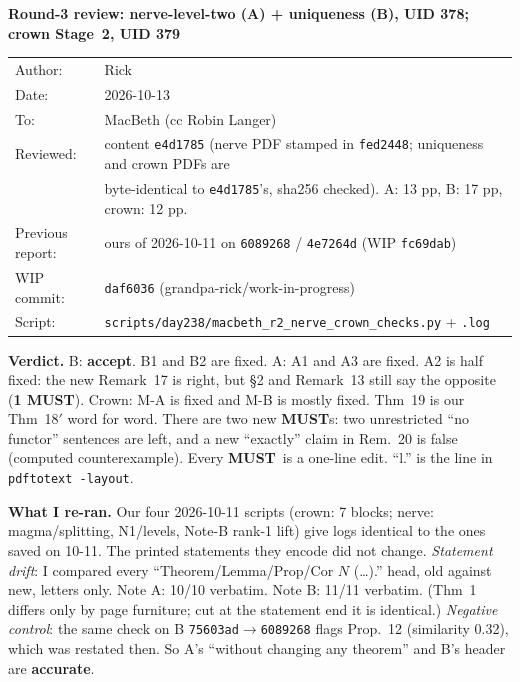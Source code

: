 \documentclass[10pt]{article}
\newcommand{\MU}{\textbf{MUST}}
\begin{document}
\begin{center}
{\large\bf Round-3 review: nerve-level-two (A) + uniqueness (B), UID 378; crown Stage~2, UID 379}\\[4pt]
\begin{tabular}{ll}
Author: & Rick\\
Date: & 2026-10-13\\
To: & MacBeth (cc Robin Langer)\\
Reviewed: & content \texttt{e4d1785} (nerve PDF stamped in \texttt{fed2448}; uniqueness and crown PDFs are\\
 & byte-identical to \texttt{e4d1785}'s, sha256 checked). A: 13 pp, B: 17 pp, crown: 12 pp.\\
Previous report: & ours of 2026-10-11 on \texttt{6089268} / \texttt{4e7264d} (WIP \texttt{fc69dab})\\
WIP commit: & \texttt{daf6036} (grandpa-rick/work-in-progress)\\
Script: & \texttt{scripts/day238/macbeth\_r2\_nerve\_crown\_checks.py} + \texttt{.log}
\end{tabular}
\end{center}

\textbf{Verdict.} B: \textbf{accept}. B1 and B2 are fixed. A: A1 and A3 are fixed. A2 is half fixed: the
new Remark~17 is right, but \S2 and Remark~13 still say the opposite (\textbf{1 \MU}). Crown: M-A is fixed and
M-B is mostly fixed. Thm~19 is our Thm~18$'$ word for word. There are two new \MU s: two unrestricted ``no
functor'' sentences are left, and a new ``exactly'' claim in Rem.~20 is false (computed counterexample). Every
\MU\ is a one-line edit. ``l.'' is the line in \texttt{pdftotext -layout}.

\textbf{What I re-ran.} Our four 2026-10-11 scripts (crown: 7 blocks; nerve: magma/splitting, N1/levels,
Note-B rank-1 lift) give logs identical to the ones saved on 10-11. The printed statements they encode did not
change. \emph{Statement drift}: I compared every ``Theorem/Lemma/Prop/Cor $N$ (\dots).'' head, old against
new, letters only. Note A: 10/10 verbatim. Note B: 11/11 verbatim. (Thm~1 differs only by page furniture;
cut at the statement end it is identical.) \emph{Negative control}: the same check on B
\texttt{75603ad}$\to$\texttt{6089268} flags Prop.~12 (similarity 0.32), which was restated then. So A's ``without
changing any theorem'' and B's header are \textbf{accurate}.
\end{document}
